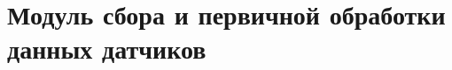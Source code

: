 



\setcounter{page}{2}

\vspace{10cm}



	











\section*{Модуль сбора и первичной обработки данных датчиков} \label{lst:BBBSoft}


\begingroup
\captiondelim{ } %

\endgroup


\vspace{12mm}

\begingroup
\captiondelim{ } %

\endgroup


